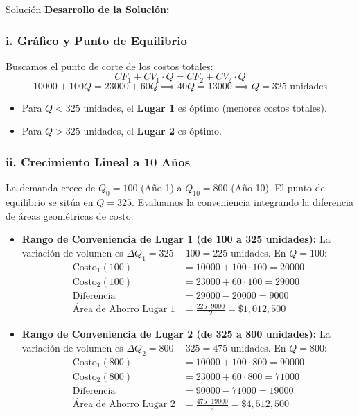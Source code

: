 \documentclass[11pt, a4paper]{article}
\begin{document}
  \medskip
  \begin{ejercicio}{Solución}
  \textbf{Desarrollo de la Solución:}

  \subsubsection*{i. Gráfico y Punto de Equilibrio}
  Buscamos el punto de corte de los costos totales:
  \begin{equation*}
    CF_1 + CV_1 \cdot Q = CF_2 + CV_2 \cdot Q
  \end{equation*}
  \begin{equation*}
    10000 + 100 Q = 23000 + 60 Q \implies 40 Q = 13000 \implies Q = 325 \text{ unidades}
  \end{equation*}

  \begin{itemize}
    \item Para $Q < 325$ unidades, el \textbf{Lugar 1} es óptimo (menores costos totales).
    \item Para $Q > 325$ unidades, el \textbf{Lugar 2} es óptimo.
  \end{itemize}

  \subsubsection*{ii. Crecimiento Lineal a 10 Años}
  La demanda crece de $Q_0 = 100$ (Año 1) a $Q_{10} = 800$ (Año 10).
  El punto de equilibrio se sitúa en $Q = 325$.
  Evaluamos la conveniencia integrando la diferencia de áreas geométricas de costo:
  \begin{itemize}
    \item \textbf{Rango de Conveniencia de Lugar 1 (de 100 a 325 unidades):}
      La variación de volumen es $\Delta Q_1 = 325 - 100 = 225$ unidades.
      En $Q = 100$:
      \begin{align*}
        \text{Costo}_1(100) &= 10000 + 100 \cdot 100 = 20000 \\
        \text{Costo}_2(100) &= 23000 + 60 \cdot 100 = 29000 \\
        \text{Diferencia} &= 29000 - 20000 = 9000 \\
        \text{Área de Ahorro Lugar 1} &= \frac{225 \cdot 9000}{2} = \$1,012,500
      \end{align*}

    \item \textbf{Rango de Conveniencia de Lugar 2 (de 325 a 800 unidades):}
      La variación de volumen es $\Delta Q_2 = 800 - 325 = 475$ unidades.
      En $Q = 800$:
      \begin{align*}
        \text{Costo}_1(800) &= 10000 + 100 \cdot 800 = 90000 \\
        \text{Costo}_2(800) &= 23000 + 60 \cdot 800 = 71000 \\
        \text{Diferencia} &= 90000 - 71000 = 19000 \\
        \text{Área de Ahorro Lugar 2} &= \frac{475 \cdot 19000}{2} = \$4,512,500
      \end{align*}
  \end{itemize}


\end{ejercicio}
\end{document}
